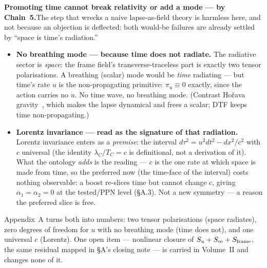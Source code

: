 \documentclass[11pt]{article}
\begin{document}
\begin{tcolorbox}
\textbf{Promoting time cannot break relativity or add a mode --- by Chain~5.}\enspace The step that
wrecks a naive lapse-as-field theory is harmless here, and not because an objection is deflected: both
would-be failures are already settled by ``space is time's radiation.''
\begin{itemize}[leftmargin=1.5em,itemsep=4pt,topsep=3pt]
  \item \textbf{No breathing mode --- because time does not radiate.} The radiative sector is
    \emph{space}: the frame field's transverse-traceless part is exactly two tensor polarisations. A
    breathing (scalar) mode would be \emph{time} radiating --- but time's rate $u$ is the non-propagating
    primitive: $\pi_u\equiv0$ exactly, since the action carries no $\dot u$. No time wave, no breathing
    mode. (Contrast Ho\v{r}ava gravity~\cite{Horava2009}, which makes the lapse dynamical and frees a scalar; DTF keeps
    time non-propagating.)
  \item \textbf{Lorentz invariance --- read as the signature of that radiation.} Lorentz invariance
    enters as a \emph{premise}: the interval $d\tau^2=u^2dt^2-dx^2/c^2$ with $c$ universal (the identity
    $\lambda_C/T_C=c$ is definitional, not a derivation of it). What the ontology \emph{adds} is the
    reading --- $c$ is the one rate at which space is made from time, so the preferred now (the time-face
    of the interval) costs nothing observable: a boost re-slices time but cannot change $c$, giving
    $\alpha_1=\alpha_2=0$ at the tested/PPN level (\S A.3). Not a new symmetry --- a reason the preferred
    slice is free.
\end{itemize}
\noindent Appendix~A turns both into numbers: two tensor polarisations (space radiates), zero degrees of
freedom for $u$ with no breathing mode (time does not), and one universal $c$ (Lorentz). One open
item --- nonlinear closure of $S_u+S_m+S_{\rm frame}$, the same residual mapped in \S A's closing note ---
is carried in Volume~II and changes none of it.
\end{tcolorbox}
\end{document}
